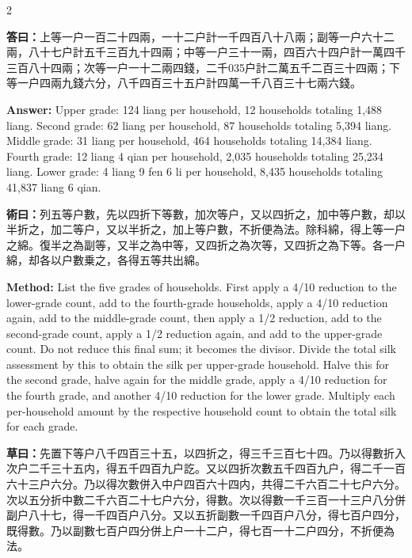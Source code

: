 \documentclass[11pt,a4paper]{article}
\newcommand{\AnswerText}[1]{\par\noindent\textbf{\color{answercolor}答曰：}#1\par}
\newcommand{\MethodText}[1]{\par\noindent\textbf{\color{methodcolor}術曰：}#1\par}
\newcommand{\WorkingText}[1]{\par\noindent\textbf{草曰：}#1\par}
\newcommand{\AnswerEn}[1]{\par\noindent\textbf{\color{answercolor}Answer:} #1\par}
\newcommand{\MethodEn}[1]{\par\noindent\textbf{\color{methodcolor}Method:} #1\par}
\begin{document}
\begin{paracol}{2}
\AnswerText{上等一户一百二十四兩，一十二户計一千四百八十八兩；副等一户六十二兩，八十七户計五千三百九十四兩；中等一户三十一兩，四百六十四户計一萬四千三百八十四兩；次等一户一十二兩四錢，二千035户計二萬五千二百三十四兩；下等一户四兩九錢六分，八千四百三十五户計四萬一千八百三十七兩六錢。}
\switchcolumn
\AnswerEn{Upper grade: 124 liang per household, 12 households totaling 1,488 liang. Second grade: 62 liang per household, 87 households totaling 5,394 liang. Middle grade: 31 liang per household, 464 households totaling 14,384 liang. Fourth grade: 12 liang 4 qian per household, 2,035 households totaling 25,234 liang. Lower grade: 4 liang 9 fen 6 li per household, 8,435 households totaling 41,837 liang 6 qian.}
\switchcolumn*

\MethodText{列五等户數，先以四折下等數，加次等户，又以四折之，加中等户數，却以半折之，加二等户，又以半折之，加上等户數，不折便為法。除科綿，得上等一户之綿。復半之為副等，又半之為中等，又四折之為次等，又四折之為下等。各一户綿，却各以户數乗之，各得五等共出綿。}
\switchcolumn
\MethodEn{List the five grades of households. First apply a 4/10 reduction to the lower-grade count, add to the fourth-grade households, apply a 4/10 reduction again, add to the middle-grade count, then apply a 1/2 reduction, add to the second-grade count, apply a 1/2 reduction again, and add to the upper-grade count. Do not reduce this final sum; it becomes the divisor. Divide the total silk assessment by this to obtain the silk per upper-grade household. Halve this for the second grade, halve again for the middle grade, apply a 4/10 reduction for the fourth grade, and another 4/10 reduction for the lower grade. Multiply each per-household amount by the respective household count to obtain the total silk for each grade.}
\switchcolumn*

\WorkingText{先置下等户八千四百三十五，以四折之，得三千三百七十四。乃以得數折入次户二千三十五内，得五千四百九户訖。又以四折次數五千四百九户，得二千一百六十三户六分。乃以得次數併入中户四百六十四内，共得二千六百二十七户六分。次以五分折中數二千六百二十七户六分，得數。次以得數一千三百一十三户八分併副户八十七，得一千四百户八分。又以五折副數一千四百户八分，得七百户四分，既得數。乃以副數七百户四分併上户一十二户，得七百一十二户四分，不折便為法。

}
\end{paracol}
\end{document}
